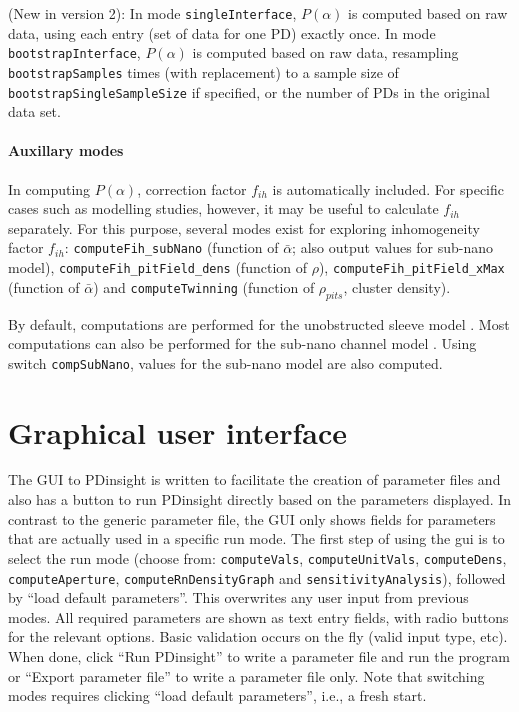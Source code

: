 \documentclass[a4paper,12pt]{article}
\newcommand{\SEL}{\bar{\alpha}}
\newcommand{\patchy}{f_{ih}}
\begin{document}
(New in version 2): In mode \texttt{singleInterface}, $P(\alpha)$ is computed based on raw data, using each entry (set of data for one PD) exactly once. In mode \texttt{bootstrapInterface}, $P(\alpha)$ is computed based on raw data, resampling \texttt{bootstrapSamples} times (with replacement) to a sample size of \texttt{bootstrapSingleSampleSize} if specified, or the number of PDs in the original data set. 


\paragraph{Auxillary modes} In computing $P(\alpha)$, correction factor $\patchy$ is automatically included. For specific cases such as modelling studies, however, it may be useful to calculate $\patchy$ separately. For this purpose, several modes exist for  exploring inhomogeneity factor $\patchy$: \texttt{computeFih\_subNano} (function of $\SEL$; also output values for sub-nano model), \texttt{computeFih\_pitField\_dens} (function of $\rho$), \texttt{computeFih\_pitField\_xMax} (function of $\SEL$) and \texttt{computeTwinning} (function of $\rho_{pits}$, cluster density). 


By default, computations are performed for the unobstructed sleeve model \citep{Deinum.e19}. Most computations can also be performed for the sub-nano channel model \cite{Liesche.fps13,Comtet.pp17}. Using switch \texttt{compSubNano}, values for the sub-nano model are also computed. 

\section{Graphical user interface}
The GUI to PDinsight is written to facilitate the creation of parameter files and also has a button to run PDinsight directly based on the parameters displayed. In contrast to the generic parameter file, the GUI only shows fields for parameters that are actually used in a specific run mode. The first step of using the gui is to select the run mode (choose from: \texttt{computeVals}, \texttt{computeUnitVals}, \texttt{computeDens}, \texttt{computeAperture},  \texttt{computeRnDensityGraph} and \texttt{sensitivityAnalysis}), followed by ``load default parameters''. This overwrites any user input from previous modes. All required parameters are shown as text entry fields, with radio buttons for the relevant options. Basic validation occurs on the fly (valid input type, etc). When done, click ``Run PDinsight'' to write a parameter file and run the program or ``Export parameter file'' to write a parameter file only. Note that switching modes requires clicking ``load default parameters'', i.e., a fresh start. 
\end{document}
